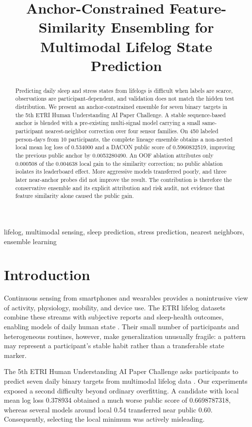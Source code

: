 \documentclass[conference]{IEEEtran}
\title{Anchor-Constrained Feature-Similarity Ensembling for Multimodal Lifelog State Prediction}
\author{
\IEEEauthorblockN{\paperauthorname}
\IEEEauthorblockA{\paperaffiliation\\
\paperemail}
}
\begin{document}
\maketitle

\begin{abstract}
Predicting daily sleep and stress states from lifelogs is difficult when labels are scarce, observations are participant-dependent, and validation does not match the hidden test distribution. We present an anchor-constrained ensemble for seven binary targets in the 5th ETRI Human Understanding AI Paper Challenge. A stable sequence-based anchor is blended with a pre-existing multi-signal model carrying a small same-participant nearest-neighbor correction over four sensor families. On 450 labeled person-days from 10 participants, the complete lineage ensemble obtains a non-nested local mean log loss of 0.534000 and a DACON public score of 0.5960832519, improving the previous public anchor by 0.0053280490. An OOF ablation attributes only 0.000508 of the 0.004638 local gain to the similarity correction; no public ablation isolates its leaderboard effect. More aggressive models transferred poorly, and three later near-anchor probes did not improve the result. The contribution is therefore the conservative ensemble and its explicit attribution and risk audit, not evidence that feature similarity alone caused the public gain.
\end{abstract}

\begin{IEEEkeywords}
lifelog, multimodal sensing, sleep prediction, stress prediction, nearest neighbors, ensemble learning
\end{IEEEkeywords}

\section{Introduction}
Continuous sensing from smartphones and wearables provides a nonintrusive view of activity, physiology, mobility, and device use. The ETRI lifelog datasets combine these streams with subjective reports and sleep-health outcomes, enabling models of daily human state \cite{oh2025etri,oh2024challenge}. Their small number of participants and heterogeneous routines, however, make generalization unusually fragile: a pattern may represent a participant's stable habit rather than a transferable state marker.

The 5th ETRI Human Understanding AI Paper Challenge asks participants to predict seven daily binary targets from multimodal lifelog data \cite{dacon2026rules}. Our experiments exposed a second difficulty beyond ordinary overfitting. A candidate with local mean log loss 0.378934 obtained a much worse public score of 0.6698787318, whereas several models around local 0.54 transferred near public 0.60. Consequently, selecting the local minimum was actively misleading.
\end{document}
